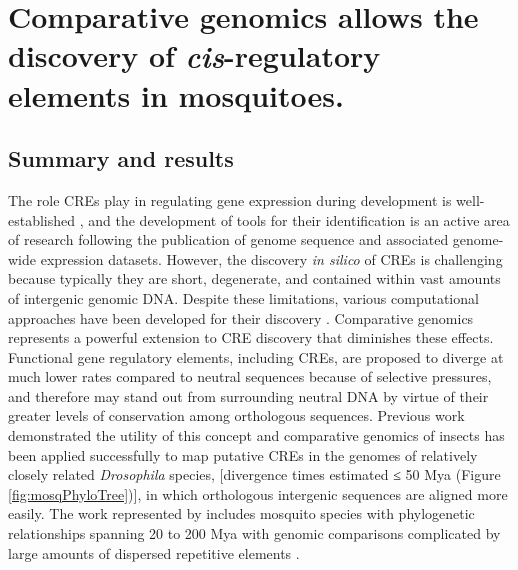 \section{Comparative genomics allows the discovery of \textit{cis}-regulatory elements in mosquitoes. \cite{Sieglaff2009}}





\subsection{Summary and results}
The role \glspl{CRE} play in regulating gene expression during development is well-established \cite{Davidson2010}, and the development of tools for their identification is an active area of research following the publication of genome sequence and associated genome-wide expression datasets. However, the discovery \textit{in silico} of \glspl{CRE} is challenging because typically they are short, degenerate, and contained within vast amounts of intergenic genomic DNA. Despite these limitations, various computational approaches have been developed for their discovery \cite{Das2007a,Hu2005,Tompa2005,Wasserman2004}. Comparative genomics represents a powerful extension to \gls{CRE} discovery that diminishes these effects. Functional gene regulatory elements, including \glspl{CRE}, are proposed to diverge at much lower rates compared to neutral sequences because of selective pressures, and therefore may stand out from surrounding neutral DNA by virtue of their greater levels of conservation among orthologous sequences. Previous work demonstrated the utility of this concept \cite{Elemento2005,Stark2007,Xie2005} and comparative genomics of insects has been applied successfully to map putative \glspl{CRE} in the genomes of relatively closely related \textit{Drosophila} species, [divergence times estimated ≤ 50 \gls{Mya} \cite{Stark2007} (Figure \ref{fig:mosqPhyloTree})], in which orthologous intergenic sequences are aligned more easily. The work represented by \citet{Sieglaff2009} includes mosquito species with phylogenetic relationships spanning 20 to 200 \gls{Mya} with genomic comparisons complicated by large amounts of dispersed repetitive elements \cite{Nene2007}.

